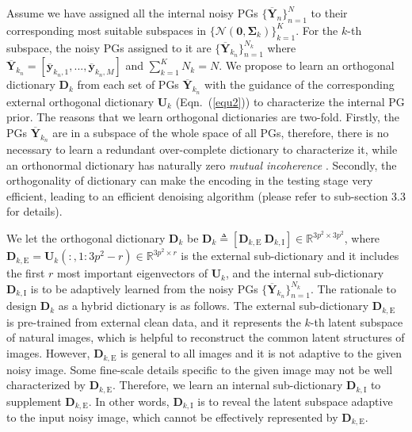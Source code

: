 \documentclass[10pt,twocolumn,letterpaper]{article}
\begin{document}
Assume we have assigned all the internal noisy PGs $\{\mathbf{\overline{Y}}_{n}\}_{n=1}^{N}$ to their corresponding most suitable subspaces in $\{\mathcal{N}(\mathbf{0},\mathbf{\Sigma}_{k})\}_{k=1}^{K}$. For the $k$-th subspace, the noisy PGs assigned to it are $\{\mathbf{\overline{Y}}_{k_{n}}\}_{n=1}^{N_{k}}$ where $\mathbf{\overline{Y}}_{k_{n}}=[\mathbf{\overline{y}}_{k_{n},1},...,\mathbf{\overline{y}}_{k_{n},M}]$ and $\sum_{k=1}^{K}N_{k}=N$. We propose to learn an orthogonal dictionary $\mathbf{D}_{k}$ from each set of PGs $\mathbf{\overline{Y}}_{k_{n}}$ with the guidance of the corresponding external orthogonal dictionary $\mathbf{U}_{k}$ (Eqn.\ (\ref{equ2})) to characterize the internal PG prior. The reasons that we learn orthogonal dictionaries are two-fold. Firstly, the PGs $\mathbf{\overline{Y}}_{k_{n}}$ are in a subspace of the whole space of all PGs, therefore, there is no necessary to learn a redundant over-complete dictionary to characterize it, while an orthonormal dictionary has naturally zero \emph{mutual incoherence} \cite{donoho2001uncertainty}. Secondly, the orthogonality of dictionary can make the encoding in the testing stage very efficient, leading to an efficient denoising algorithm (please refer to sub-section 3.3 for details).

We let the orthogonal dictionary $\mathbf{D}_{k}$ be $\mathbf{D}_{k}\triangleq[\mathbf{D}_{k,\text{E}}\ \mathbf{D}_{k,\text{I}}]\in \mathbb{R}^{3p^2\times 3p^2}$, where $\mathbf{D}_{k,\text{E}}=\mathbf{U}_{k}(:,1:3p^2-r)\in\mathbb{R}^{3p^2\times r}$ is the external sub-dictionary and it includes the first $r$ most important eigenvectors of $\mathbf{U}_{k}$, and the internal sub-dictionary $\mathbf{D}_{k,\text{I}}$ is to be adaptively learned from the noisy PGs $\{\mathbf{\overline{Y}}_{k_{n}}\}_{n=1}^{N_{k}}$. The rationale to design $\mathbf{D}_{k}$ as a hybrid dictionary is as follows. The external sub-dictionary $\mathbf{D}_{k,\text{E}}$ is pre-trained from external clean data, and it represents the $k$-th latent subspace of natural images, which is helpful to reconstruct the common latent structures of images. However, $\mathbf{D}_{k,\text{E}}$ is general to all images and it is not adaptive to the given noisy image. Some fine-scale details specific to the given image may not be well characterized by $\mathbf{D}_{k,\text{E}}$. Therefore, we learn an internal sub-dictionary $\mathbf{D}_{k,\text{I}}$ to supplement $\mathbf{D}_{k,\text{E}}$. In other words, $\mathbf{D}_{k,\text{I}}$ is to reveal the latent subspace adaptive to the input noisy image, which cannot be effectively represented by $\mathbf{D}_{k,\text{E}}$. 
\end{document}
